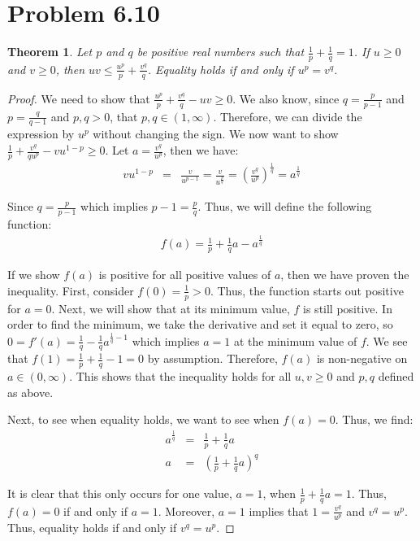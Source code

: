 \documentclass[psamsfonts]{amsart}
\newtheorem{thm}{Theorem}[section]
\theoremstyle{definition}
\theoremstyle{remark}
\numberwithin{equation}{section}
\begin{document}
\section{Problem 6.10}

\begin{thm}
Let $p$ and $q$ be positive real numbers such that $\frac{1}{p} + \frac{1}{q} = 1$. If $u \geq 0$ and $v \geq 0$, then $uv \leq \frac{u^p}{p} + \frac{v^q}{q}$. Equality holds if and only if $u^p = v^q$. 
\end{thm}

\begin{proof}
We need to show that $\frac{u^p}{p} + \frac{v^q}{q} - uv \geq 0$. We also know, since $q = \frac{p}{p-1}$ and $p = \frac{q}{q-1}$ and $p,q > 0$, that $p,q \in (1,\infty)$. Therefore, we can divide the expression by $u^p$ without changing the sign. We now want to show $\frac{1}{p} + \frac{v^q}{q u^p} - v u^{1-p} \geq 0$. Let $a = \frac{v^q}{u^p}$, then we have: 
\begin{eqnarray}
v u^{1-p} &=& \frac{v}{u^{p-1}} = \frac{v}{u^{\frac{p}{q}}} = \left( \frac{v^q}{u^p} \right)^{\frac{1}{q}} = a^{\frac{1}{q}}
\end{eqnarray}

Since $q = \frac{p}{p-1}$ which implies $p-1 = \frac{p}{q}$. Thus, we will define the following function:
\begin{eqnarray}
f(a) = \frac{1}{p} + \frac{1}{q} a - a^{\frac{1}{q}}
\end{eqnarray}

If we show $f(a)$ is positive for all positive values of $a$, then we have proven the inequality. First, consider $f(0) = \frac{1}{p} > 0$. Thus, the function starts out positive for $a=0$. Next, we will show that at its minimum value, $f$ is still positive. In order to find the minimum, we take the derivative and set it equal to zero, so $0 = f'(a) = \frac{1}{q} - \frac{1}{q} a^{\frac{1}{q} - 1}$ which implies $a = 1$ at the minimum value of $f$. We see that $f(1) = \frac{1}{p} + \frac{1}{q} - 1 = 0$ by assumption. Therefore, $f(a)$ is non-negative on $a \in (0,\infty)$. This shows that the inequality holds for all $u,v \geq 0$ and $p,q$ defined as above. 

Next, to see when equality holds, we want to see when $f(a) = 0$. Thus, we find:
\begin{eqnarray}
a^{\frac{1}{q}}&=& \frac{1}{p} + \frac{1}{q} a \\
a &=& \left( \frac{1}{p} + \frac{1}{q}a \right)^q
\end{eqnarray}

It is clear that this only occurs for one value, $a=1$, when $\frac{1}{p} + \frac{1}{q}a = 1$. Thus, $f(a) = 0$ if and only if $a =1$. Moreover, $a=1$ implies that $1 = \frac{v^q}{u^p}$ and $v^q = u^p$. Thus, equality holds if and only if $v^q = u^p$. 
\end{proof}
\end{document}
